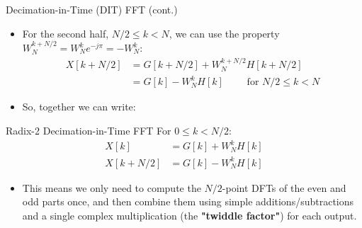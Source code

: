 \begin{frame}{Decimation-in-Time (DIT) FFT (cont.)}
    \begin{itemize}
        \item For the second half, $N/2 \le k < N$, we can use the property $W_N^{k+N/2} = W_N^k e^{-j\pi} = -W_N^k$:
              \begin{align*}
                  X[k + N/2] & = G[k + N/2] + W_N^{k+N/2} H[k + N/2]                 \\
                             & = G[k] - W_N^k H[k] \qquad \text{ for } N/2 \le k < N
              \end{align*}

        \item So, together we can write:
    \end{itemize}
    \begin{conceptbox}{Radix-2 Decimation-in-Time FFT}
        For $0 \le k < N/2$:
        \begin{align*}
            X[k]       & = G[k] + W_N^k H[k] \\
            X[k + N/2] & = G[k] - W_N^k H[k]
        \end{align*}
    \end{conceptbox}
    \begin{itemize}
        \item This means we only need to compute the $N/2$-point DFTs of the even and odd parts once, and then combine them using simple additions/subtractions and a single complex multiplication (the \textbf{"twiddle factor"}) for each output.
    \end{itemize}
\end{frame}

